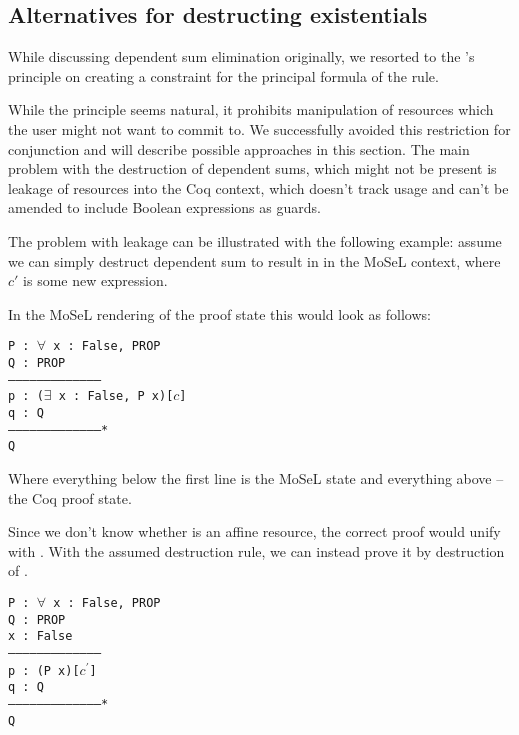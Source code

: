 \subsection{Alternatives for destructing existentials}
\label{subsec:design_decisions_existential}

While discussing dependent sum elimination originally, we resorted to the \citeauthor{harlandResourceDistributionBooleanConstraints2003}'s principle on creating a constraint for the principal formula of the rule.

While the principle seems natural, it prohibits manipulation of resources which the user might not want to commit to.
We successfully avoided this restriction for conjunction and will describe possible approaches in this section.
The main problem with the destruction of dependent sums, which might not be present is leakage of resources into the Coq context, which doesn't track usage and can't be amended to include Boolean expressions as guards.

The problem with leakage can be illustrated with the following example: assume we can simply destruct dependent sum  to result in  in the MoSeL context, where \(c'\) is some new expression.

In the MoSeL rendering of the proof state this would look as follows:

\begin{minipage}{\linewidth}
\texttt{P : $\forall$ x : False, PROP\\
Q : PROP\\
---------------------------------------\\
p : ($\exists$ x : False, P x)[$c$]\\
q : Q\\
---------------------------------------*\\
Q
}
\end{minipage}

Where everything below the first line is the MoSeL state and everything above -- the Coq proof state.

Since we don't know whether  is an affine resource, the correct proof would unify  with \false.
With the assumed destruction rule, we can instead prove it by destruction of .

\begin{minipage}{\linewidth}
\texttt{P : $\forall$ x : False, PROP\\
Q : PROP\\
x : False\\
---------------------------------------\\
p : (P x)[$c^{'}$]\\
q : Q\\
---------------------------------------*\\
Q}
\end{minipage}


